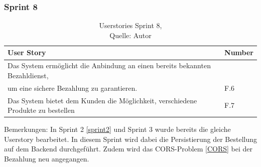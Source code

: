 \subsubsection{Sprint 8}
\begin{table}[H]
	\begin{tabularx}{\textwidth}{|l|X|}
		\hline
		\textbf{User Story} & \textbf{Number} \\
		\hline
		Das System ermöglicht die Anbindung an einen bereits bekannten Bezahldienst,\\ um eine sichere Bezahlung zu garantieren.  & F.6\\
		\hline
		Das System bietet dem Kunden die Möglichkeit, verschiedene Produkte zu bestellen& F.7\\
		\hline
	\end{tabularx} 
	\caption[Userstories Sprint 8]{Userstories Sprint 8,\\ Quelle: Autor}
\end{table}\label{userStoriesSprint8}
Bemerkungen: In Sprint 2  \ref{sprint2} und Sprint 3 wurde bereits die gleiche Userstory bearbeitet. In diesem Sprint wird dabei die Persistierung der Bestellung auf dem Backend durchgeführt. Zudem wird das CORS-Problem \ref{CORS} bei der Bezahlung neu angegangen. 

 \newpage
